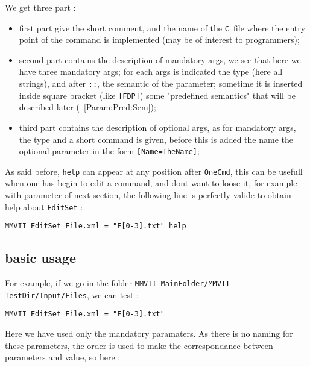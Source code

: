 \documentclass[a4paper]{book}
\newcommand{\CPP}{\mbox{\tt C\hspace{-0.05cm}\raisebox{0.2ex}{\small ++} }}
\newcommand{\MMVIDIR}{{\tt MMVII-MainFolder/}}
\begin{document}
{We get three part :


\begin{itemize}
   \item  first part give the short comment, and the name of the \CPP file where
          the entry point of the command is implemented (may be of interest to programmers);

   \item  second part contains the description of mandatory args, we see that here we
          have three mandatory args;  for each args is indicated the type (here all strings),
          and  after {\tt ::}, the semantic of the parameter;
          sometime it is inserted  inside square bracket (like {\tt [FDP]}) some "predefined semantics"
          that will be described later (~\ref{Param:Pred:Sem});

   \item  third part contains the description of optional args, as for mandatory args, 
          the type and a short command is given, before this is added the name the optional
          parameter in the form {\tt [Name=TheName]};
\end{itemize}



As said before, {\tt help} can appear at any position after {\tt OneCmd}, this can be 
usefull when one has begin to edit a command, and dont want to loose it, for example
with parameter of next section, the following line is perfectly valide to obtain
help about   {\tt EditSet} :

\begin{verbatim}
MMVII EditSet File.xml = "F[0-3].txt" help
\end{verbatim}


\subsection{basic usage}

For example, if we go in the folder  {\tt {\MMVIDIR}MMVII-TestDir/Input/Files}, we can test :

\begin{verbatim}
MMVII EditSet File.xml = "F[0-3].txt"
\end{verbatim}

Here we have used  only the mandatory paramaters. As there is no naming for these parameters,
the order is used to make the correspondance between parameters
and value, so here :

}
\end{document}
